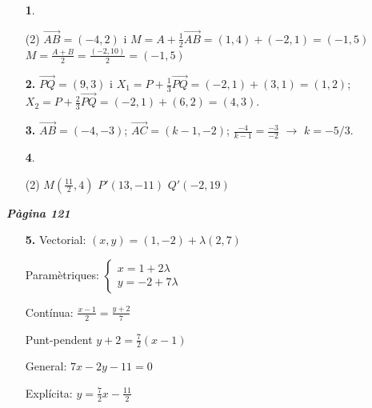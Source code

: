 \documentclass[a4paper, pdf, twoside]{book}
\begin{document}
\begin{multicols}{2}
\begin{enumerate}
 \item[\fontfamily{phv}\selectfont\color{blue}\textbf{1}. ] 
 \begin{tasks}[column-sep=1em, item-indent=1.3333em](2)
	 \task* $\overrightarrow {AB}=(-4,2)$ i $M=A+\frac {1}{2}\overrightarrow {AB}=(1,4)+(-2,1)=(-1,5)$
	 \task* $M=\frac {A+B}{2}=\frac {(-2,10)}{2}=(-1,5)$
\end{tasks}
 \end{enumerate}
\begin{enumerate}
\vspace{0.25cm}
\item[\fontfamily{phv}\selectfont\color{blue}\textbf{2. }] 
$\overrightarrow {PQ}=(9,3)$ i $X_1=P+\frac {1}{3}\overrightarrow {PQ}=(-2,1)+(3,1)=(1,2)$; $X_2=P+\frac {2}{3}\overrightarrow {PQ}=(-2,1)+(6,2)=(4,3)$.
\vspace{0.25cm}
\item[\fontfamily{phv}\selectfont\color{blue}\textbf{3. }] 
$\overrightarrow {AB}=(-4,-3)$; $\overrightarrow {AC}=(k-1,-2)$; $\frac {-4}{k-1}=\frac {-3}{-2}$ $\rightarrow $ $k=-5/3$. 
\vspace{0.25cm}



 \item[\fontfamily{phv}\selectfont\color{blue}\textbf{4}. ] 
 \begin{tasks}[column-sep=1em, item-indent=1.3333em](2)
	 \task $M(\frac {11}{2},4)$
	 \task $P'(13,-11)$
	 \task $Q'(-2,19)$
\end{tasks}
 \end{enumerate}
\vspace{0.3cm}


{\textbf{\em Pàgina 121}} \hrulefill
\begin{enumerate}
\vspace{0.25cm}
\item[\fontfamily{phv}\selectfont\color{blue}\textbf{5. }] 
Vectorial: $(x,y)=(1,-2)+\lambda (2,7)$ \par Paramètriques: $\left \{ \begin {array}{l} x=1+2\lambda \\ y=-2+7\lambda \end {array} \right .$ \par Contínua: $\frac {x-1}{2}=\frac {y+2}{7}$ \par Punt-pendent $y+2 = \frac {7}{2}(x-1)$ \par General: $7x-2y-11=0$ \par Explícita: $y=\frac {7}{2}x-\frac {11}{2}$
 \end{enumerate}
\begin{enumerate}
\vspace{0.25cm}



\end{enumerate}
\end{multicols}
\end{document}
